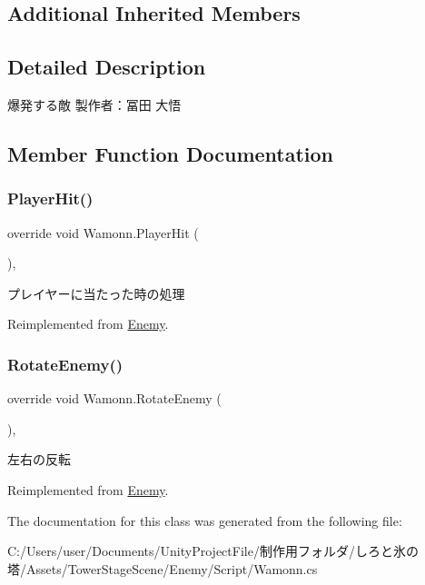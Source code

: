 \subsection*{Additional Inherited Members}


\subsection{Detailed Description}
爆発する敵 製作者：冨田 大悟 



\subsection{Member Function Documentation}
\mbox{\label{class_wamonn_a46080369edebc97e39e1841b91258856}} 
\subsubsection{\texorpdfstring{Player\+Hit()}{PlayerHit()}}
{\footnotesize\ttfamily override void Wamonn.\+Player\+Hit (\begin{DoxyParamCaption}{ }\end{DoxyParamCaption})\hspace{0.3cm}{\ttfamily [inline]}, {\ttfamily [virtual]}}



プレイヤーに当たった時の処理 



Reimplemented from \hyperlink{class_enemy_a2b5e9b4644bd49c33279403c6477ed39}{Enemy}.

\mbox{\label{class_wamonn_a84f3f9f2380c28a7e455f0cee6e9c933}} 
\subsubsection{\texorpdfstring{Rotate\+Enemy()}{RotateEnemy()}}
{\footnotesize\ttfamily override void Wamonn.\+Rotate\+Enemy (\begin{DoxyParamCaption}{ }\end{DoxyParamCaption})\hspace{0.3cm}{\ttfamily [inline]}, {\ttfamily [virtual]}}



左右の反転 



Reimplemented from \hyperlink{class_enemy_a2a0e665070fd362bd3ab2f2962ebff93}{Enemy}.



The documentation for this class was generated from the following file\+:\begin{DoxyCompactItemize}
\item 
C\+:/\+Users/user/\+Documents/\+Unity\+Project\+File/制作用フォルダ/しろと氷の塔/\+Assets/\+Tower\+Stage\+Scene/\+Enemy/\+Script/Wamonn.\+cs\end{DoxyCompactItemize}
